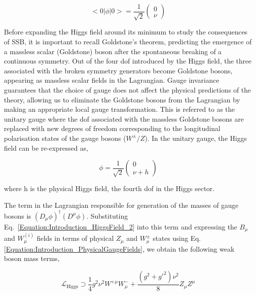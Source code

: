 \begin{equation}
    <0|\phi|0> = \frac{1}{\sqrt{2}} \begin{pmatrix}
        0 \\
        \nu
    \end{pmatrix}
\end{equation}
 
Before expanding the Higgs field around its minimum to study the consequences of SSB, it is important to recall Goldstone's theorem, predicting the emergence of a massless scalar (Goldstone) boson after the spontaneous breaking of a continuous symmetry. Out of the four dof introduced by the Higgs field, the three associated with the broken symmetry generators become Goldstone bosons, appearing as massless scalar fields in the Lagrangian. Gauge invariance guarantees that the choice of gauge does not affect the physical predictions of the theory, allowing us to eliminate the Goldstone bosons from the Lagrangian by making an appropriate local gauge transformation. This is referred to as the unitary gauge where the dof associated with the massless Goldstone bosons are replaced with new degrees of freedom corresponding to the longitudinal polarisation states of the gauge bosons ($W^{\pm}/Z$). In the unitary gauge, the Higgs field can be re-expressed as,

\begin{equation}
    \phi = \frac{1}{\sqrt{2}}\begin{pmatrix}
        0 \\
        \nu + h
    \end{pmatrix} 
    \label{Equation:Introduction_HiggsField_2}
\end{equation}

where h is the physical Higgs field, the fourth dof in the Higgs sector.

The term in the Lagrangian responsible for generation of the masses of gauge bosons is $(D_\mu\phi)^\dagger(D^\mu\phi)$. Substituting Eq.~\ref{Equation:Introduction_HiggsField_2} into this term and expressing the $B_\mu$ and $W_{\mu}^{(i)}$ fields in terms of physical $Z_\mu$ and $W_{\mu}^{\pm}$ states using Eq. \ref{Equation:Introduction_PhysicalGaugeFields}, we obtain the following weak boson mass terms,

\begin{equation}
    \mathcal{L}_{\text{Higgs}} \supset \frac{1}{4} g^2 \nu^2 W^{+\mu}W_{\mu}^- + \frac{(g^2+g'^2)\nu^2}{8} Z_\mu Z^\mu
\label{Equation:Introduction_HiggsLagrangian_2}
\end{equation}

